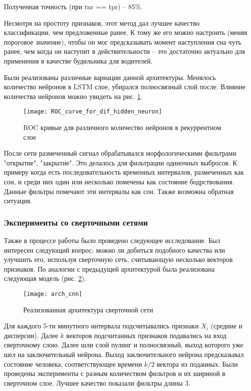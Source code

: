 Полученная точность (при tnr == tpr) -- 85\%. 

Несмотря на простоту признаков, этот метод дал лучшее качество классификации, чем предложенные ранее. К тому же его можно настроить (меняя пороговое значение), чтобы он мог предсказывать момент наступления сна чуть ранее, чем когда он наступит в действительности -- это достаточно актуально для применения в качестве будильника для водителей.

Были реализованы различные вариации данной архитектуры. Менялось количество нейронов в LSTM слое, убирался полносвязный слой после. Влияние количества нейронов можно увидеть на рис. \ref{ris:roc_rnn}.

\begin{figure}[h!]
	\begin{center}
		\texttt{[image: ROC\_curve\_for\_dif\_hidden\_neuron]}
		\caption{ROC кривые для различного количество нейронов в рекуррентном слое}
		\label{ris:roc_rnn}
	\end{center}
\end{figure}

После сети размеченный сигнал обрабатывался морфологическими фильтрами "открытие", "закрытие". Это делалось для фильтрации одиночных выбросов. К примеру когда есть последовательность временных интервалов, размеченных как сон, и среди них один или несколько помечены как состояние бодрствования. Данные фильтры помечают эти интервалы как сон. Также возможна обратная ситуация.

\subsubsection{Эксперименты со сверточными сетями}

Также в процессе работы было проведено следующее исследование. Был интересен следующий вопрос: можно ли добиться подобного качества или улучшить его, используя сверточную сеть, считывающую несколько векторов признаков. По аналогии с предыдущей архитектурой была реализована следующая модель (рис. \ref{ris:arh_cnn}).  

\begin{figure}[h!]
	\begin{center}
		\texttt{[image: arch\_cnn]}
		\caption{Реализованная архитектура сверточной сети}
		\label{ris:arh_cnn}
	\end{center}
\end{figure}

Для каждого 5-ти минутного интервала подсчитывались признаки $X_i$ (средние и дисперсии). Далее $k$ векторов подсчитанных признаков подавались на вход сверточному слою. Далее шли слой пулинг и полносвязный, выход которого уже шел на заключительный нейрона. Выход заключительного нейрона предсказывал состояние человека, соответствующее времени $k/2$ вектора из поданных. Были проведены эксперименты с разным количеством фильтров и их шириной в сверточном слое. Лучшее качество показали фильтры длины 3.

